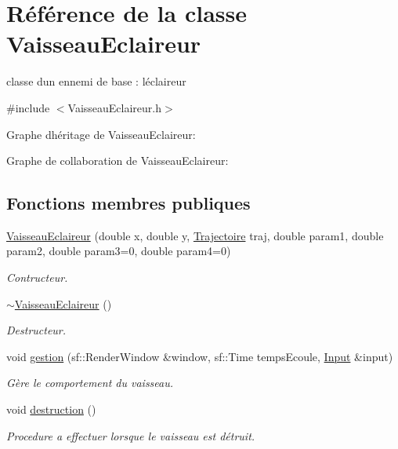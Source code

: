\hypertarget{class_vaisseau_eclaireur}{}\section{Référence de la classe Vaisseau\+Eclaireur}
\label{class_vaisseau_eclaireur}


classe d\textquotesingle{}un ennemi de base \+: l\textquotesingle{}éclaireur  




{\ttfamily \#include $<$Vaisseau\+Eclaireur.\+h$>$}



Graphe d\textquotesingle{}héritage de Vaisseau\+Eclaireur\+:


Graphe de collaboration de Vaisseau\+Eclaireur\+:
\subsection*{Fonctions membres publiques}
\begin{DoxyCompactItemize}
\item 
\hyperlink{class_vaisseau_eclaireur_ad2c1dc461224dda7e4087a8e5a907c23}{Vaisseau\+Eclaireur} (double x, double y, \hyperlink{_trajectoire_8h_afa7f6e8323d7ee755d93cd1f6019dd95}{Trajectoire} traj, double param1, double param2, double param3=0, double param4=0)
\begin{DoxyCompactList}\small\item\em Contructeur. \end{DoxyCompactList}\item 
\hyperlink{class_vaisseau_eclaireur_a3e7ef82ff40bf4736d4285311dd8624c}{$\sim$\+Vaisseau\+Eclaireur} ()
\begin{DoxyCompactList}\small\item\em Destructeur. \end{DoxyCompactList}\item 
void \hyperlink{class_vaisseau_eclaireur_aac6158ee2ff8454a93515546cb1be1de}{gestion} (sf\+::\+Render\+Window \&window, sf\+::\+Time temps\+Ecoule, \hyperlink{_input_8h_a5588d60d674991c719a8df848313e966}{Input} \&input)
\begin{DoxyCompactList}\small\item\em Gère le comportement du vaisseau. \end{DoxyCompactList}\item 
void \hyperlink{class_vaisseau_eclaireur_a4f65343b67301d7fa98f5e02337cc1e1}{destruction} ()
\begin{DoxyCompactList}\small\item\em Procedure a effectuer lorsque le vaisseau est détruit. \end{DoxyCompactList}\end{DoxyCompactItemize}
